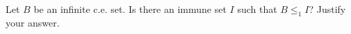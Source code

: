 \begin{problem}
  Let $B$ be an infinite c.e. set.
  Is there an immune set $I$ such that $B \leq_1 I$?
  Justify your answer.

  \begin{answer}
    
  \end{answer}
\end{problem}
